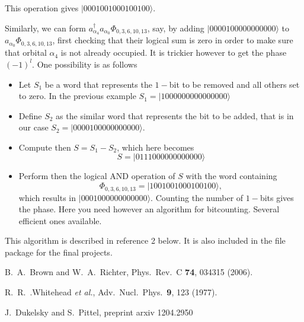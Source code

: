 \documentclass[prc]{revtex4}
\begin{document}
This operation gives $|0001001000100100\rangle$. 

Similarly, we can form $a^\dagger_{\alpha_4}a_{\alpha_0}\Phi_{0,3,6,10,13}$, say, by adding 
$|0000100000000000\rangle$ to $a_{\alpha_0}\Phi_{0,3,6,10,13}$, first checking that their logical sum
is zero in order to make sure that orbital $\alpha_4$ is not already occupied. 
It is trickier however to get the phase $(-1)^l$. 
One possibility is as follows
\begin{itemize}
\item Let $S_1$ be a word that represents the $1-$bit to be removed and all others set to zero.
In the previous example $S_1=|1000000000000000\rangle$
\item Define $S_2$ as the similar word that represents the bit to be added, that is in our case
$S_2=|0000100000000000\rangle$.
\item Compute then $S=S_1-S_2$, which here becomes
\[
S=|0111000000000000\rangle
\]
\item Perform then the logical AND operation of $S$ with the word containing 
\[
\Phi_{0,3,6,10,13} = |1001001000100100\rangle,
\]
which results in $|0001000000000000\rangle$. Counting the number of $1-$bits gives the phase.  Here you need however an algorithm for bitcounting. Several efficient ones available. 
\end{itemize}
This algorithm is described in reference 2 below. It is also included in the file package for the final projects.


\begin{thebibliography}{99}
 B.~A.~Brown and W.~A.~Richter, Phys.~Rev.~C {\bf 74},  034315 (2006).


 R.~R.~.Whitehead {\em et al.}, Adv.~Nucl.~Phys.~{\bf 9}, 123 (1977).

 J.~Dukelsky and S.~Pittel, preprint arxiv 1204.2950

\end{thebibliography}
\end{document}
